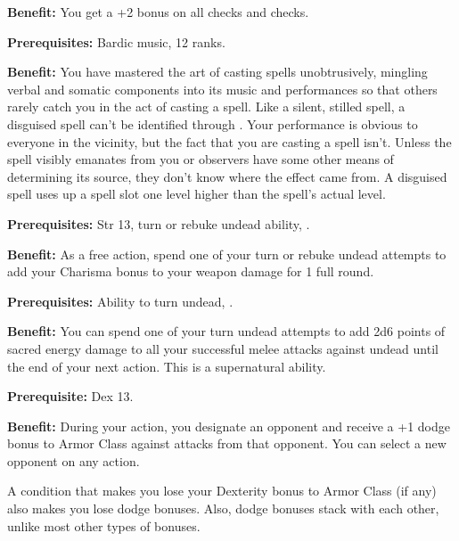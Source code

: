 
\textbf{Benefit:} You get a +2 bonus on all  checks and  
checks.


\textbf{Prerequisites:} Bardic music,  12 ranks.

\textbf{Benefit:} You have mastered the art of casting spells unobtrusively, mingling 
verbal and somatic components into its music and performances so that others rarely 
catch you in the act of casting a spell. Like a silent, stilled spell, a disguised 
spell can't be identified through . Your performance is obvious to everyone 
in the vicinity, but the fact that you are casting a spell isn't. Unless the spell 
visibly emanates from you or observers have some other means of determining its 
source, they don't know where the effect came from. A disguised spell uses up a 
spell slot one level higher than the spell's actual level.


\textbf{Prerequisites:} Str 13, turn or rebuke undead ability, .

\textbf{Benefit:} As a free action, spend one of your turn or rebuke undead attempts 
to add your Charisma bonus to your weapon damage for 1 full round.


\textbf{Prerequisites:} Ability to turn undead, .

\textbf{Benefit:} You can spend one of your turn undead attempts to add 2d6 points 
of sacred energy damage to all your successful melee attacks against undead until 
the end of your next action. This is a supernatural ability.


\textbf{Prerequisite:} Dex 13.

\textbf{Benefit:} During your action, you designate an opponent and receive a +1 
dodge bonus to Armor Class against attacks from that opponent. You can select a 
new opponent on any action.

A condition that makes you lose your Dexterity bonus to Armor Class (if any) also 
makes you lose dodge bonuses. Also, dodge bonuses stack with each other, unlike 
most other types of bonuses.

